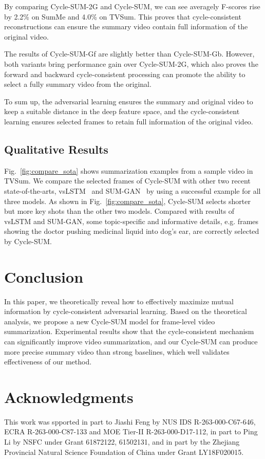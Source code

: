\documentclass[letterpaper]{article} \usepackage{aaai19}  \usepackage{times}  \usepackage{helvet}  \usepackage{courier}  \usepackage{url}  \usepackage{graphicx}  \frenchspacing  \setlength{\pdfpagewidth}{8.5in}  \setlength{\pdfpageheight}{11in}  \usepackage{amsmath}
\begin{document}
By comparing Cycle-SUM-2G and Cycle-SUM, we can see  averagely F-scores rise by 2.2\% on SumMe and 4.0\% on TVSum. This proves that cycle-consistent reconstructions can ensure the summary video contain full information of the original video. 

The results of Cycle-SUM-Gf are slightly better than Cycle-SUM-Gb. However, both variants bring performance gain over Cycle-SUM-2G, which also proves  the forward and backward cycle-consistent processing can promote the ability to select a fully summary video from the original.

To sum up, the adversarial learning ensures the summary  and original video to keep a suitable distance in the deep feature space, and the cycle-consistent learning ensures selected  frames to retain full information of the original video.

\subsection{Qualitative Results}


Fig.~\ref{fig:compare_sota} shows summarization examples from a sample video in TVSum. We compare the selected frames of Cycle-SUM with other two recent state-of-the-arts, vsLSTM~\cite{zhang2016video} and SUM-GAN~\cite{mahasseni2017unsupervised} by using a successful example for all three models. As shown in Fig.~\ref{fig:compare_sota}, Cycle-SUM selects shorter but more key shots than the other two models.
Compared with  results of vsLSTM and SUM-GAN, some topic-specific and informative details, e.g. frames showing the doctor pushing medicinal liquid into dog's ear, are correctly selected by Cycle-SUM.





\section{Conclusion}
In this paper, we theoretically reveal how to effectively maximize mutual information by cycle-consistent adversarial learning. Based on the theoretical analysis, we propose a new Cycle-SUM model for frame-level video summarization. Experimental results show that the cycle-consistent mechanism can significantly improve video summarization, and our Cycle-SUM can produce more precise summary video than strong baselines, which well validates effectiveness of our method.



\section{ Acknowledgments}
This work was spported in part to Jiashi Feng by NUS IDS R-263-000-C67-646,  ECRA R-263-000-C87-133 and MOE Tier-II R-263-000-D17-112, in part to Ping Li by NSFC under Grant 61872122, 61502131, and in part by the Zhejiang Provincial Natural Science Foundation of China under Grant LY18F020015.




\end{document}
